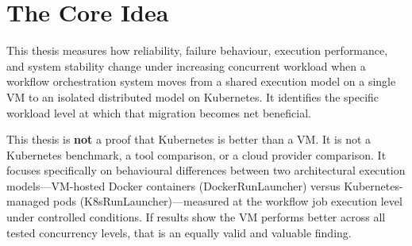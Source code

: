 
\section{The Core Idea}
\label{sec:core-idea}

This thesis measures how reliability, failure behaviour, execution performance, and system stability change under increasing concurrent workload when a workflow orchestration system moves from a shared execution model on a single VM to an isolated distributed model on Kubernetes. It identifies the specific workload level at which that migration becomes net beneficial.

This thesis is \textbf{not} a proof that Kubernetes is better than a VM. It is not a Kubernetes benchmark, a tool comparison, or a cloud provider comparison. It focuses specifically on behavioural differences between two architectural execution models---VM-hosted Docker containers (DockerRunLauncher) versus Kubernetes-managed pods (K8sRunLauncher)---measured at the workflow job execution level under controlled conditions. If results show the VM performs better across all tested concurrency levels, that is an equally valid and valuable finding.
